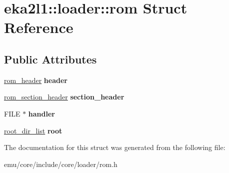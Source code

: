 \hypertarget{structeka2l1_1_1loader_1_1rom}{}\section{eka2l1\+:\+:loader\+:\+:rom Struct Reference}
\label{structeka2l1_1_1loader_1_1rom}
\subsection*{Public Attributes}
\begin{DoxyCompactItemize}
\item 
\mbox{\label{structeka2l1_1_1loader_1_1rom_a2c9321bc73a093d8e5ea0e609e850b92}} 
\mbox{\hyperlink{structeka2l1_1_1loader_1_1rom__header}{rom\+\_\+header}} {\bfseries header}
\item 
\mbox{\label{structeka2l1_1_1loader_1_1rom_ad9b78b9135d1c49e7283b76100619478}} 
\mbox{\hyperlink{structeka2l1_1_1loader_1_1rom__section__header}{rom\+\_\+section\+\_\+header}} {\bfseries section\+\_\+header}
\item 
\mbox{\label{structeka2l1_1_1loader_1_1rom_abb231a18a001e795cf3a9dc74f833e57}} 
F\+I\+LE $\ast$ {\bfseries handler}
\item 
\mbox{\label{structeka2l1_1_1loader_1_1rom_a6d3678e499647af45b75b8e6464bf712}} 
\mbox{\hyperlink{structeka2l1_1_1loader_1_1root__dir__list}{root\+\_\+dir\+\_\+list}} {\bfseries root}
\end{DoxyCompactItemize}


The documentation for this struct was generated from the following file\+:\begin{DoxyCompactItemize}
\item 
emu/core/include/core/loader/rom.\+h\end{DoxyCompactItemize}
